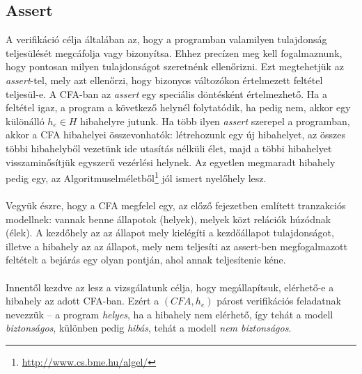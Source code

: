\subsection{Assert}
A verifikáció célja általában az, hogy a programban valamilyen tulajdonság teljesülését megcáfolja vagy bizonyítsa. Ehhez precízen meg kell fogalmaznunk, hogy pontosan milyen tulajdonságot szeretnénk ellenőrizni. Ezt megtehetjük az \emph{assert}-tel, mely azt ellenőrzi, hogy bizonyos változókon értelmezett feltétel teljesül-e. 
\newline
\newline
A CFA-ban az \emph{assert} egy speciális döntésként értelmezhető. Ha a feltétel igaz, a program a következő helynél folytatódik, ha pedig nem, akkor egy különálló $h_e \in H$ hibahelyre jutunk. Ha több ilyen \emph{assert} szerepel a programban, akkor a CFA hibahelyei összevonhatók: létrehozunk egy új hibahelyet, az összes többi hibahelyből vezetünk ide utasítás nélküli élet, majd a többi hibahelyet visszaminősítjük egyszerű vezérlési helynek. Az egyetlen megmaradt hibahely pedig egy, az Algoritmuselméletből\footnote{\url{http://www.cs.bme.hu/algel/}} jól ismert nyelőhely lesz. 
\\
\\
Vegyük észre, hogy a CFA megfelel egy, az előző fejezetben említett tranzakciós modellnek: vannak benne állapotok (helyek), melyek közt relációk húzódnak (élek). A kezdőhely az az állapot mely kielégíti a kezdőállapot tulajdonságot, illetve a hibahely az az állapot, mely nem teljesíti az assert-ben megfogalmazott feltételt a bejárás egy olyan pontján, ahol annak teljesítenie kéne.
\\
\\
Innentől kezdve az lesz a vizsgálatunk célja, hogy megállapítsuk, elérhető-e a hibahely az adott CFA-ban. Ezért a $(\mathit{CFA}, h_e)$ párost verifikációs feladatnak nevezzük -- a program \emph{helyes}, ha a hibahely nem elérhető, így tehát a modell \textit{biztonságos}, különben pedig \emph{hibás}, tehát a modell \textit{nem biztonságos}.
\ \\
